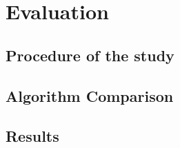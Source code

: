 \chapter{Evaluation}\label{chapter:evaluation}

\section{Procedure of the study}

\section{Algorithm Comparison}

\section{Results}